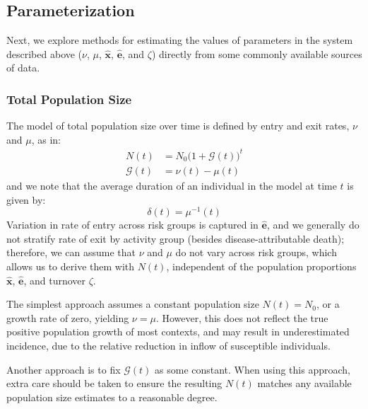 \subsection{Parameterization}\label{ss:params}
Next, we explore methods for estimating the values of parameters
in the system described above
($\nu$, $\mu$, $\bm{\hat{x}}$, $\bm{\hat{e}}$, and $\zeta$)
directly from some commonly available sources of data.
\subsubsection{Total Population Size}\label{sss:params-nu-mu}
The model of total population size over time is defined by
entry and exit rates, $\nu$ and $\mu$, as in:
\begin{subequations}
  \begin{align}
  N(t) &= N_0 {\big(1+\mathcal{G}(t)\big)}^{t} \label{eq:growth-N}\\
  \mathcal{G}(t) &= \nu(t) - \mu(t)              \label{eq:growth-G}
  \end{align}
\end{subequations}
and we note that the average duration of an individual in the model at time $t$
is given by:
\begin{equation} \label{eq:duration-model}
\delta(t) = \mu^{-1}(t)
\end{equation}
Variation in rate of entry across risk groups is captured in $\bm{\hat{e}}$,
and we generally do not stratify rate of exit by activity group
(besides disease-attributable death);
therefore, we can assume that $\nu$ and $\mu$ do not vary across risk groups,
which allows us to derive them with $N(t)$, independent of
the population proportions $\bm{\hat{x}}$, $\bm{\hat{e}}$, and turnover $\zeta$.
\par
The simplest approach assumes a constant population size $N(t) = N_0$,
or a growth rate of zero, yielding $\nu = \mu$.
However, this does not reflect the true positive population growth of most contexts,
and may result in underestimated incidence,
due to the relative reduction in inflow of susceptible individuals.
\par
Another approach is to fix $\mathcal{G}(t)$ as some constant.
When using this approach, extra care should be taken to ensure
the resulting $N(t)$ matches any available population size estimates to a reasonable degree.
